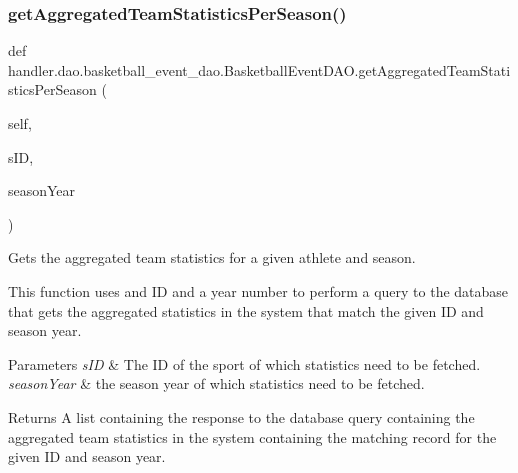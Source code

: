 \subsubsection{\texorpdfstring{get\+Aggregated\+Team\+Statistics\+Per\+Season()}{getAggregatedTeamStatisticsPerSeason()}}
{\footnotesize\ttfamily def handler.\+dao.\+basketball\+\_\+event\+\_\+dao.\+Basketball\+Event\+D\+A\+O.\+get\+Aggregated\+Team\+Statistics\+Per\+Season (\begin{DoxyParamCaption}\item[{}]{self,  }\item[{}]{s\+ID,  }\item[{}]{season\+Year }\end{DoxyParamCaption})}



Gets the aggregated team statistics for a given athlete and season. 

This function uses and ID and a year number to perform a query to the database that gets the aggregated statistics in the system that match the given ID and season year.


\begin{DoxyParams}{Parameters}
{\em s\+ID} & The ID of the sport of which statistics need to be fetched. \\
\hline
{\em season\+Year} & the season year of which statistics need to be fetched.\\
\hline
\end{DoxyParams}
\begin{DoxyReturn}{Returns}
A list containing the response to the database query containing the aggregated team statistics in the system containing the matching record for the given ID and season year. 
\end{DoxyReturn}
\mbox{\label{classhandler_1_1dao_1_1basketball__event__dao_1_1_basketball_event_d_a_o_a1e711ea382e54616539aa2249f4c5f75}} 
